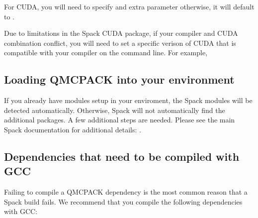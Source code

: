 \documentclass[letterpaper,10pt,english]{sphinxmanual}
\begin{document}
For CUDA, you will need to specify and extra 
parameter otherwise, it will default to .

\begin{sphinxVerbatim}[commandchars=\\\{\}]
     
\end{sphinxVerbatim}

Due to limitations in the Spack CUDA package, if your compiler and
CUDA combination conflict, you will need to set a
specific verison of CUDA that is compatible with your compiler on the
command line. For example,

\begin{sphinxVerbatim}[commandchars=\\\{\}]
      
\end{sphinxVerbatim}


\subsection{Loading QMCPACK into your environment}
\label{\detokenize{installation:loading-qmcpack-into-your-environment}}
If you already have modules set\sphinxhyphen{}up in your enviroment, the Spack
modules will be detected automatically. Otherwise, Spack will not
automatically find the additional packages. A few additional steps are
needed.  Please see the main Spack documentation for additional details: .


\subsection{Dependencies that need to be compiled with GCC}
\label{\detokenize{installation:dependencies-that-need-to-be-compiled-with-gcc}}
Failing to compile a QMCPACK dependency is the most common reason that
a Spack build fails. We recommend that you compile the following
dependencies with GCC:
\end{document}
